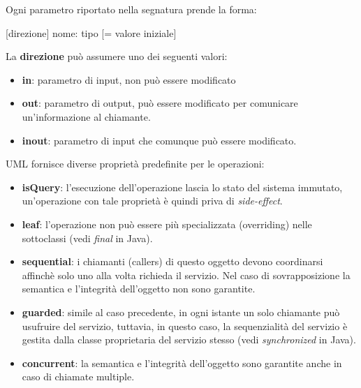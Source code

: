 \documentclass{article}
\begin{document}
	Ogni parametro riportato nella segnatura prende la forma:
	\begin{center}
		[direzione] nome: tipo [= valore iniziale]
	\end{center}
	La \textbf{direzione} può assumere uno dei seguenti valori:
	\begin{itemize}
		\item \textbf{in}: parametro di input, non può essere modificato
		\item \textbf{out}: parametro di output, può essere modificato per comunicare un'informazione al chiamante.
		\item \textbf{inout}: parametro di input che comunque può essere modificato.
	\end{itemize}
	UML fornisce diverse proprietà predefinite per le operazioni:
	\begin{itemize}
		\item \textbf{isQuery}: l'esecuzione dell'operazione lascia lo stato del sistema immutato, un'operazione con tale proprietà è quindi priva di \textit{side-effect}.
		\item \textbf{leaf}: l'operazione non può essere più specializzata (overriding) nelle sottoclassi (vedi \textit{final} in Java).
		\item \textbf{sequential}: i chiamanti (callers) di questo oggetto devono coordinarsi affinchè solo uno alla volta richieda il servizio. Nel caso di sovrapposizione la semantica e l'integrità dell'oggetto non sono garantite.
		\item \textbf{guarded}: simile al caso precedente, in ogni istante un solo chiamante può usufruire del servizio, tuttavia, in questo caso, la sequenzialità del servizio è gestita dalla classe proprietaria del servizio stesso (vedi \textit{synchronized} in Java).
		\item \textbf{concurrent}: la semantica e l'integrità dell'oggetto sono garantite anche in caso di chiamate multiple.
	\end{itemize}
\end{document}
